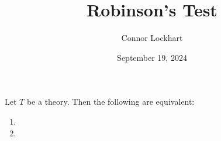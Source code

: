 \documentclass[a4paper]{article}
\title{Robinson's Test}
\date{September 19, 2024}
\author{Connor Lockhart}
\begin{document}
\maketitle
\par{ Let \(T\) be a theory. Then the following are equivalent:}\begin{enumerate}
\item{}
    \item{}
\end{enumerate}
\printbibliography
\end{document}
